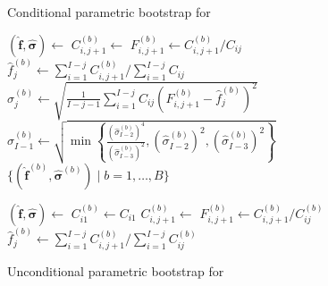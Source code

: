 \documentclass[a4paper]{book}
\begin{document}
\begin{figure}[p]
  \begin{algorithm}[H]
    \caption{Conditional parametric bootstrap for }
    \label{alg:cond-param-mack}
    \begin{algorithmic}
      \State $(\bm{\widehat{f}}, \bm{\widehat{\sigma}}) \gets$ 
            \State $C^{(b)}_{i, j + 1} \gets$ 
            \State $F^{(b)}_{i, j + 1} \gets C^{(b)}_{i, j + 1} / C_{ij}$
          \EndFor
          \State $\widehat{f}^{(b)}_j \gets \sum_{i = 1}^{I - j} C^{(b)}_{i, j + 1} / \sum_{i = 1}^{I - j} C_{ij}$
            \State $\widehat{\sigma}^{(b)}_j \gets \sqrt{\frac{1}{I - j - 1}\sum_{i = 1}^{I - j} C_{ij} \left( F^{(b)}_{i, j + 1} - \widehat{f}^{(b)}_j \right)^2}$
          \Else
            \State $\widehat{\sigma}^{(b)}_{I - 1} \gets \sqrt{\min{ \left \{ \frac{(\widehat{\sigma}^{(b)}_{I - 2})^4}{(\widehat{\sigma}^{(b)}_{I - 3})^2}, (\widehat{\sigma}^{(b)}_{I - 2})^2, (\widehat{\sigma}^{(b)}_{I - 3})^2 \right \} }}$
          \EndIf
        \EndFor
      \EndFor
      \State \Return $\{ (\widehat{\bm{f}}^{(b)}, \widehat{\bm{\sigma}}^{(b)}) \mid b = 1, \dots, B \}$
    \end{algorithmic}
  \end{algorithm}
  \begin{algorithm}[H]
    \caption{Unconditional parametric bootstrap for }
    \label{alg:uncond-param-mack}
    \begin{algorithmic}
      \State $(\bm{\widehat{f}}, \bm{\widehat{\sigma}}) \gets$ 
          \State $C^{(b)}_{i1} \gets C_{i1}$
        \EndFor
            \State $C^{(b)}_{i, j + 1} \gets$ 
            \State $F^{(b)}_{i, j + 1} \gets C^{(b)}_{i, j + 1} / C^{(b)}_{ij}$
          \EndFor
          \State $\widehat{f}^{(b)}_j \gets \sum_{i = 1}^{I - j} C^{(b)}_{i, j + 1} / \sum_{i = 1}^{I - j} C^{(b)}_{ij}$

\end{algorithmic}
\end{algorithm}
\end{figure}
\end{document}
